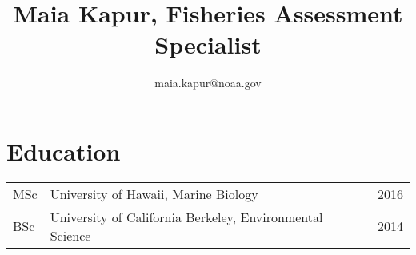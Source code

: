 \documentclass[10pt, letterpaper]{article}
\begin{document}
\title{Maia Kapur, Fisheries Assessment Specialist}
\author{maia.kapur@noaa.gov}

\maketitle
\vspace{-15mm}
\noindent\makebox[\linewidth]{\rule{\paperwidth}{0.4pt}}
\section*{Education}
\begin{tabular}{lll}

MSc & University of Hawaii, Marine Biology & 2016 \\
BSc & University of California Berkeley, Environmental Science & 2014 \\
\end{tabular}
\end{document}
